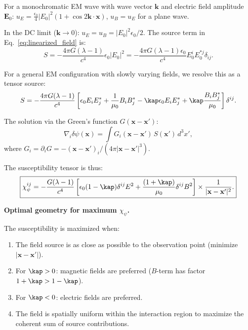 \documentclass[11pt,twocolumn]{article}
\newcommand{\dpsi}{\delta\psi}
\newcommand{\lam}{\lambda}
\begin{document}
For a monochromatic EM wave with wave vector $\mathbf{k}$ and electric
field amplitude $\mathbf{E}_0$:
$u_E = \frac{\epsilon_0}{4}|E_0|^2(1 + \cos 2\mathbf{k}\cdot\mathbf{x})$,
$u_B = u_E$ for a plane wave.

In the DC limit ($\mathbf{k}\to 0$): $u_E = u_B = |E_0|^2\epsilon_0/2$.
The source term in Eq.~\eqref{eq:linearized_field} is:
\begin{equation}
S = -\frac{4\pi G(\lam-1)}{c^4}\epsilon_0|E_0|^2
= -\frac{4\pi G(\lam-1)\epsilon_0}{c^4}E_0^i E_0^{*j}\delta_{ij}.
\end{equation}

For a general EM configuration with slowly varying fields, we resolve
this as a tensor source:
\begin{equation}
S = -\frac{4\pi G(\lam-1)}{c^4}\left[
\epsilon_0 E_i E_j^* + \frac{1}{\mu_0}B_i B_j^*
- \kap\epsilon_0 E_i E_j^* + \kap\frac{B_i B_j^*}{\mu_0}
\right]\delta^{ij}.
\label{eq:tensor_source}
\end{equation}

The solution via the Green's function $G(\mathbf{x}-\mathbf{x}')$:
\begin{equation}
\nabla_i\dpsi(\mathbf{x}) = \int G_i(\mathbf{x}-\mathbf{x}')\,
S(\mathbf{x}')\,d^3x',
\label{eq:green_soln}
\end{equation}
where $G_i = \partial_i G = -(\mathbf{x}-\mathbf{x}')_i/(4\pi|\mathbf{x}-\mathbf{x}'|^3)$.

The susceptibility tensor is thus:
\begin{equation}
\boxed{
\chi_\psi^{ij} = -\frac{G(\lam-1)}{c^4}
\left[\epsilon_0(1-\kap)\delta^{ij}E^2
+ \frac{(1+\kap)}{\mu_0}\delta^{ij}B^2
\right] \times \frac{1}{|\mathbf{x}-\mathbf{x}'|^2}.
}
\label{eq:chi_tensor}
\end{equation}

\textbf{Optimal geometry for maximum $\chi_\psi$.}

The susceptibility is maximized when:
\begin{enumerate}[noitemsep]
\item The field source is as close as possible to the observation point
  (minimize $|\mathbf{x}-\mathbf{x}'|$).
\item For $\kap > 0$: magnetic fields are preferred
  ($B$-term has factor $1+\kap > 1-\kap$).
\item For $\kap < 0$: electric fields are preferred.
\item The field is spatially uniform within the interaction region to
  maximize the coherent sum of source contributions.
\end{enumerate}
\end{document}
